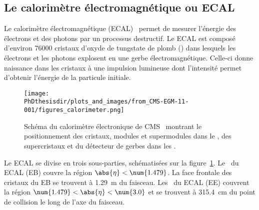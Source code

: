 \subsection{Le calorimètre électromagnétique ou ECAL}\label{chapter-LHC-section-CMS-subsec-ECAL}
Le calorimètre électromagnétique (ECAL)~\cite{cms_paper,CERN-LHCC-97-033,CMS-EGM-11-001,CMS-DP-2019-005,CMS-DP-2020-021} permet de mesurer l'énergie des électrons et des photons par un processus destructif.
Le ECAL est composé d'environ \num{76000} cristaux d'oxyde de tungstate de plomb () dans lesquels les électrons et les photons explosent en une gerbe électromagnétique.
Celle-ci donne naissance dans les cristaux à une impulsion lumineuse dont l'intensité permet d'obtenir l'énergie de la particule initiale.
\begin{figure}[b]
\centering
\texttt{[image: \\PhDthesisdir/plots\_and\_images/from\_CMS-EGM-11-001/figures\_calorimeter.png]}
\caption[Schéma du calorimètre électronique de CMS.]{Schéma du calorimètre électronique de CMS~\cite{cms_paper,CMS-EGM-11-001} montrant le positionnement des cristaux, modules et supermodules dans le \CMSbarrel, des supercristaux et du détecteur de gerbes dans les \CMSendcaps.}
\label{fig-chapter-LHC-section-CMS-subsec-ECAL-CMS-EGM-11-001-figures_calorimeter}
\end{figure}
\par Le ECAL se divise en trois sous-parties, schématisées sur la figure~\ref{fig-chapter-LHC-section-CMS-subsec-ECAL-CMS-EGM-11-001-figures_calorimeter}.
Le \CMSbarrel\ du ECAL (EB) couvre la région $\abs{\eta}<\num{1.479}$.
La face frontale des cristaux du EB se trouvent à \SI{1.29}{\meter} du faisceau.
Les \CMSendcaps\ du ECAL (EE) couvrent la région $\num{1.479}<\abs{\eta}<\num{3.0}$ et se trouvent à \SI{315.4}{\centi\meter} du point de collision le long de l'axe du faisceau.
